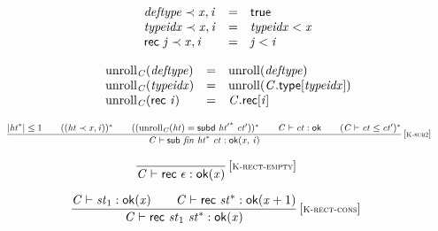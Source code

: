 $$
\begin{array}{@{}lcl@{}l@{}}
{\mathit{deftype}} \prec {\mathit{x}}, {\mathit{i}} &=& \mathsf{true} &  \\
{\mathit{typeidx}} \prec {\mathit{x}}, {\mathit{i}} &=& {\mathit{typeidx}} < {\mathit{x}} &  \\
\mathsf{rec}~{\mathit{j}} \prec {\mathit{x}}, {\mathit{i}} &=& {\mathit{j}} < {\mathit{i}} &  \\
\end{array}
$$

$$
\begin{array}{@{}lcl@{}l@{}}
{{\mathrm{unroll}}}_{{\mathit{C}}}({\mathit{deftype}}) &=& {\mathrm{unroll}}({\mathit{deftype}}) &  \\
{{\mathrm{unroll}}}_{{\mathit{C}}}({\mathit{typeidx}}) &=& {\mathrm{unroll}}({\mathit{C}}.\mathsf{type}{}[{\mathit{typeidx}}]) &  \\
{{\mathrm{unroll}}}_{{\mathit{C}}}(\mathsf{rec}~{\mathit{i}}) &=& {\mathit{C}}.\mathsf{rec}{}[{\mathit{i}}] &  \\
\end{array}
$$

$$
\begin{array}{@{}c@{}}\displaystyle
\frac{
{|{{\mathit{ht}}^\ast}|} \leq 1
 \qquad
(({\mathit{ht}} \prec {\mathit{x}}, {\mathit{i}}))^\ast
 \qquad
(({{\mathrm{unroll}}}_{{\mathit{C}}}({\mathit{ht}}) = \mathsf{subd}~{{\mathit{ht}'}^\ast}~{\mathit{ct}'}))^\ast
 \qquad
{\mathit{C}} \vdash {\mathit{ct}} : \mathsf{ok}
 \qquad
({\mathit{C}} \vdash {\mathit{ct}} \leq {\mathit{ct}'})^\ast
}{
{\mathit{C}} \vdash \mathsf{sub}~{\mathit{fin}}~{{\mathit{ht}}^\ast}~{\mathit{ct}} : {\mathsf{ok}}{({\mathit{x}},\, {\mathit{i}})}
} \, {[\textsc{\scriptsize K{-}sub2}]}
\qquad
\end{array}
$$

\vspace{1ex}

$$
\begin{array}{@{}c@{}}\displaystyle
\frac{
}{
{\mathit{C}} \vdash \mathsf{rec}~\epsilon : {\mathsf{ok}}{({\mathit{x}})}
} \, {[\textsc{\scriptsize K{-}rect{-}empty}]}
\qquad
\end{array}
$$

$$
\begin{array}{@{}c@{}}\displaystyle
\frac{
{\mathit{C}} \vdash {\mathit{st}}_{{1}} : {\mathsf{ok}}{({\mathit{x}})}
 \qquad
{\mathit{C}} \vdash \mathsf{rec}~{{\mathit{st}}^\ast} : {\mathsf{ok}}{({\mathit{x}} + 1)}
}{
{\mathit{C}} \vdash \mathsf{rec}~{\mathit{st}}_{{1}}~{{\mathit{st}}^\ast} : {\mathsf{ok}}{({\mathit{x}})}
} \, {[\textsc{\scriptsize K{-}rect{-}cons}]}
\qquad
\end{array}
$$

